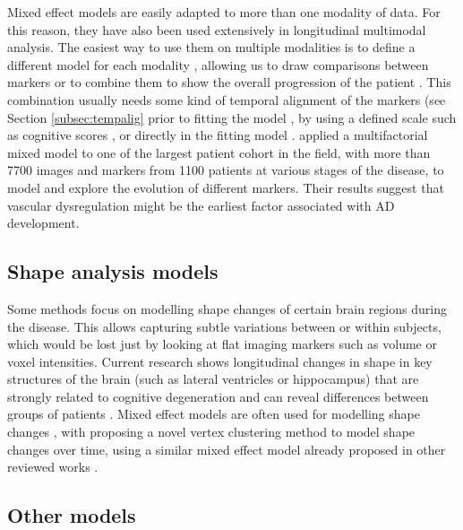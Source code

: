 Mixed effect models are easily adapted to more than one modality of data. For this reason, they have also been used extensively in longitudinal multimodal analysis. The easiest way to use them on multiple modalities is to define a different model for each modality \cite{Dodge2014,Guerrero2016,Li2017c}, allowing us to draw comparisons between markers \cite{Jedynak2012} or to combine them to show the overall progression of the patient \cite{Bilgel2015a,Bilgel2016,Donohue14,Jedynak2012,Li2017a}. This combination usually needs some kind of temporal alignment of the markers (see Section \ref{subsec:tempalig} prior to fitting the model \cite{Guerrero2016}, by using a defined scale such as cognitive scores \cite{Yang2011}, or directly in the fitting model \cite{Li2017a}. \cite{Iturria-Medina2016} applied a multifactorial mixed model to one of the largest patient cohort in the field, with more than 7700 images and markers from 1100 patients at various stages of the disease, to model and explore the evolution of different markers. Their results suggest that vascular dysregulation might be the earliest factor associated with AD development. 

\subsection{Shape analysis models}

Some methods focus on modelling shape changes of certain brain regions during the disease. This allows capturing subtle variations between or within subjects, which would be lost just by looking at flat imaging markers such as volume or voxel intensities. Current research shows longitudinal changes in shape in key structures of the brain (such as lateral ventricles or hippocampus) that are strongly related to cognitive degeneration \cite{Gui2017,Tang2015} and can reveal differences between groups of patients \cite{Bone2017,Bone2018,Gutman2013}. Mixed effect models are often used for modelling shape changes \cite{Bone2017,Bone2018,Gui2017,Tang2015}, with \cite{Eshaghi2017} proposing a novel vertex clustering method to model shape changes over time, using a similar mixed effect model already proposed in other reviewed works \cite{Donohue14,Jedynak2012,Schiratti2015}.

\subsection{Other models}


